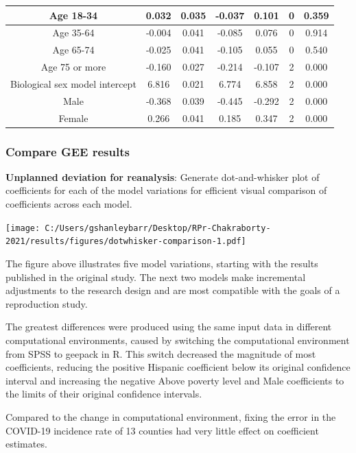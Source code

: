 \documentclass[
]{article}
\begin{document}
\begin{table}
\begin{tabular}[t]{c|c|c|c|c|c|c}
\hline
Age 18-34 & 0.032 & 0.035 & -0.037 & 0.101 & 0 & 0.359\\
\hline
Age 35-64 & -0.004 & 0.041 & -0.085 & 0.076 & 0 & 0.914\\
\hline
Age 65-74 & -0.025 & 0.041 & -0.105 & 0.055 & 0 & 0.540\\
\hline
Age 75 or more & -0.160 & 0.027 & -0.214 & -0.107 & 2 & 0.000\\
\hline
Biological sex model intercept & 6.816 & 0.021 & 6.774 & 6.858 & 2 & 0.000\\
\hline
Male & -0.368 & 0.039 & -0.445 & -0.292 & 2 & 0.000\\
\hline
Female & 0.266 & 0.041 & 0.185 & 0.347 & 2 & 0.000\\
\hline
\end{tabular}
\end{table}

\hypertarget{compare-gee-results}{%
\subsubsection{Compare GEE results}\label{compare-gee-results}}

\textbf{Unplanned deviation for reanalysis}: Generate dot-and-whisker
plot of coefficients for each of the model variations for efficient
visual comparison of coefficients across each model.

\texttt{[image: C:/Users/gshanleybarr/Desktop/RPr-Chakraborty-2021/results/figures/dotwhisker-comparison-1.pdf]}

The figure above illustrates five model variations, starting with the
results published in the original study. The next two models make
incremental adjustments to the research design and are most compatible
with the goals of a reproduction study.

The greatest differences were produced using the same input data in
different computational environments, caused by switching the
computational environment from SPSS to geepack in R. This switch
decreased the magnitude of most coefficients, reducing the positive
Hispanic coefficient below its original confidence interval and
increasing the negative Above poverty level and Male coefficients to the
limits of their original confidence intervals.

Compared to the change in computational environment, fixing the error in
the COVID-19 incidence rate of 13 counties had very little effect on
coefficient estimates.
\end{document}
